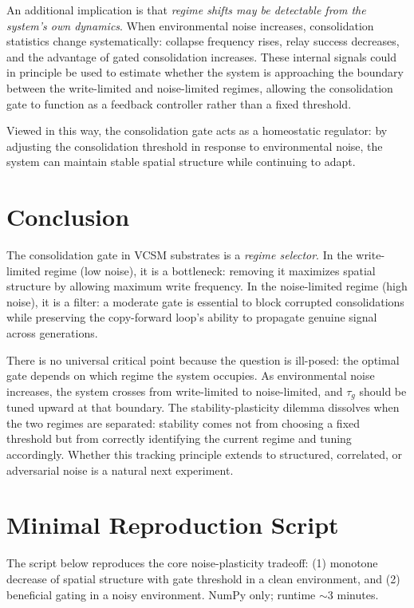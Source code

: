\documentclass[11pt,twocolumn]{article}
\begin{document}
An additional implication is that \emph{regime shifts may be detectable from
the system's own dynamics}. When environmental noise increases, consolidation
statistics change systematically: collapse frequency rises, relay success
decreases, and the advantage of gated consolidation increases.
These internal signals could in principle be used to estimate whether the system
is approaching the boundary between the write-limited and noise-limited regimes,
allowing the consolidation gate to function as a feedback controller rather than
a fixed threshold.

Viewed in this way, the consolidation gate acts as a homeostatic regulator:
by adjusting the consolidation threshold in response to environmental noise,
the system can maintain stable spatial structure while continuing to adapt.

\section{Conclusion}

The consolidation gate in VCSM substrates is a \emph{regime selector}.
In the write-limited regime (low noise), it is a bottleneck: removing it
maximizes spatial structure by allowing maximum write frequency.
In the noise-limited regime (high noise), it is a filter: a moderate gate is
essential to block corrupted consolidations while preserving the copy-forward
loop's ability to propagate genuine signal across generations.

There is no universal critical point because the question is ill-posed: the
optimal gate depends on which regime the system occupies. As environmental noise
increases, the system crosses from write-limited to noise-limited, and $\tau_g$
should be tuned upward at that boundary.
The stability-plasticity dilemma dissolves when the two regimes are separated:
stability comes not from choosing a fixed threshold but from correctly
identifying the current regime and tuning accordingly.
Whether this tracking principle extends to structured, correlated, or
adversarial noise is a natural next experiment.

\appendix
\onecolumn
\section{Minimal Reproduction Script}

The script below reproduces the core noise-plasticity tradeoff: (1) monotone decrease of spatial structure with gate threshold in a clean environment, and (2) beneficial gating in a noisy environment. NumPy only; runtime $\sim$3 minutes.
\end{document}
